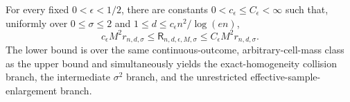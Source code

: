 For every fixed \(0<\epsilon<1/2\), there are constants \(0<c_{\epsilon}\le C_{\epsilon}<\infty\) such that, uniformly over \(0\le\sigma\le2\) and \(1\le d\le c_{\epsilon}n^2/\log(en)\), \[c_{\epsilon}M^2r_{n,d,\sigma}\le\mathsf R_{n,d,\epsilon,M,\sigma}\le C_{\epsilon}M^2r_{n,d,\sigma}.\] The lower bound is over the same continuous-outcome, arbitrary-cell-mass class as the upper bound and simultaneously yields the exact-homogeneity collision branch, the intermediate \(\sigma^2\) branch, and the unrestricted effective-sample-enlargement branch.